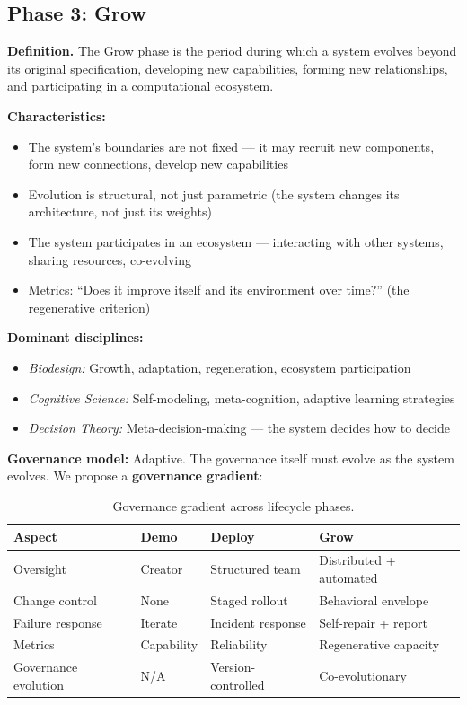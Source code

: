 \documentclass[11pt,a4paper]{article}
\begin{document}
\subsection{Phase 3: Grow}

\textbf{Definition.} The Grow phase is the period during which a system evolves beyond its original specification, developing new capabilities, forming new relationships, and participating in a computational ecosystem.

\textbf{Characteristics:}
\begin{itemize}[nosep]
    \item The system's boundaries are not fixed --- it may recruit new components, form new connections, develop new capabilities
    \item Evolution is structural, not just parametric (the system changes its architecture, not just its weights)
    \item The system participates in an ecosystem --- interacting with other systems, sharing resources, co-evolving
    \item Metrics: ``Does it improve itself and its environment over time?'' (the regenerative criterion)
\end{itemize}

\textbf{Dominant disciplines:}
\begin{itemize}[nosep]
    \item \emph{Biodesign:} Growth, adaptation, regeneration, ecosystem participation
    \item \emph{Cognitive Science:} Self-modeling, meta-cognition, adaptive learning strategies
    \item \emph{Decision Theory:} Meta-decision-making --- the system decides how to decide
\end{itemize}

\textbf{Governance model:} Adaptive. The governance itself must evolve as the system evolves. We propose a \textbf{governance gradient}:

\begin{table}[htbp]
\centering
\begin{tabular}{>{\raggedright\arraybackslash}p{3cm} p{3cm} p{3cm} p{3.5cm}}
\toprule
\textbf{Aspect} & \textbf{Demo} & \textbf{Deploy} & \textbf{Grow} \\
\midrule
Oversight & Creator & Structured team & Distributed + automated \\
Change control & None & Staged rollout & Behavioral envelope \\
Failure response & Iterate & Incident response & Self-repair + report \\
Metrics & Capability & Reliability & Regenerative capacity \\
Governance evolution & N/A & Version-controlled & Co-evolutionary \\
\bottomrule
\end{tabular}
\caption{Governance gradient across lifecycle phases.}
\label{tab:governance-gradient}
\end{table}
\end{document}
